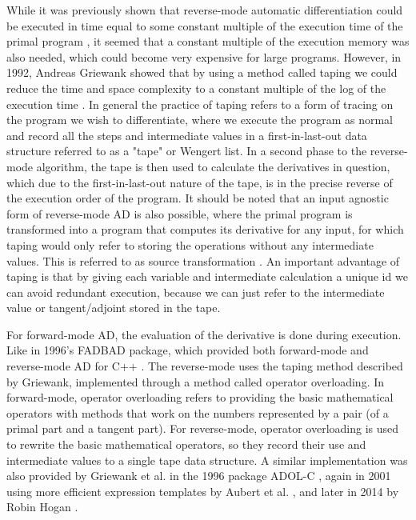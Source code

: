         While it was previously shown that reverse-mode automatic differentiation could be executed in time equal to some constant multiple of the execution time of the primal program \cite{linnainmaa1976taylor}, it seemed that a constant multiple of the execution memory was also needed, which could become very expensive for large programs.
        However, in 1992, Andreas Griewank showed that by using a method called taping we could reduce the time and space complexity to a constant multiple of the log of the execution time \cite{griewank1992achieving}.
        In general the practice of taping refers to a form of tracing on the program we wish to differentiate, where we execute the program as normal and record all the steps and intermediate values in a first-in-last-out data structure referred to as a "tape" or Wengert list.
        In a second phase to the reverse-mode algorithm, the tape is then used to calculate the derivatives in question, which due to the first-in-last-out nature of the tape, is in the precise reverse of the execution order of the program.
        It should be noted that an input agnostic form of reverse-mode AD is also possible, where the primal program is transformed into a program that computes its derivative for any input, for which taping would only refer to storing the operations without any intermediate values.
        This is referred to as source transformation \cite{bischof2000computing}.
        An important advantage of taping is that by giving each variable and intermediate calculation a unique id we can avoid redundant execution, because we can just refer to the intermediate value or tangent/adjoint stored in the tape.
        
        For forward-mode AD, the evaluation of the derivative is done during execution. Like in 1996's FADBAD package, which provided both forward-mode and reverse-mode AD for C++ \cite{bendtsen1996fadbad}.
        The reverse-mode uses the taping method described by Griewank, implemented through a method called operator overloading.
        In forward-mode, operator overloading refers to providing the basic mathematical operators with methods that work on the numbers represented by a pair (of a primal part and a tangent part).
        For reverse-mode, operator overloading is used to rewrite the basic mathematical operators, so they record their use and intermediate values to a single tape data structure.
        A similar implementation was also provided by Griewank et al. in the 1996 package ADOL-C \cite{griewank1996algorithm}, again in 2001 using more efficient expression templates by Aubert et al. \cite{aubert2001automatic}, and later in 2014 by Robin Hogan \cite{hogan2014fast}.

